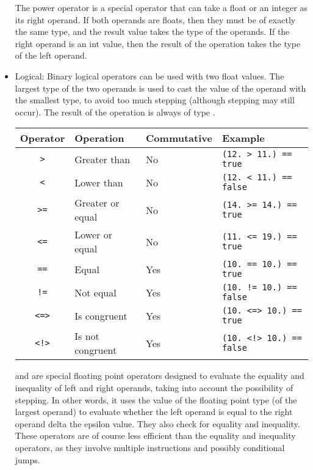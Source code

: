 \begin{itemize}
  The power operator \token{\textasciicircum{}\textasciicircum{}} is a special
  operator that can take a float or an integer as its right operand. If both
  operands are floats, then they must be of exactly the same type, and the
  result value takes the type of the operands. If the right operand is an int
  value, then the result of the operation takes the type of the left operand.

\item Logical: Binary logical operators can be used with two float values. The
  largest type of the two operands is used to cast the value of the operand with
  the smallest type, to avoid too much stepping (although stepping may still
  occur). The result of the operation is always of type .

  \begin{center}
    \begin{adjustbox}{max width=1.0\linewidth}
      \begin{tabular}{|c|lll|}
        \hline
        Operator & Operation & Commutative & Example\\[0pt]
        \hline
        \hline
        \texttt{>} & Greater than & No & \texttt{(12. > 11.) == true}\\[0pt]
        \texttt{<} & Lower than & No & \texttt{(12. < 11.) == false}\\[0pt]
        \texttt{>=} & Greater or equal & No & \texttt{(14. >= 14.) == true}\\[0pt]
        \texttt{<=} & Lower or equal & No & \texttt{(11. <= 19.) == true}\\[0pt]
        \texttt{==} & Equal & Yes & \texttt{(10. == 10.) == true}\\[0pt]
        \texttt{!=} & Not equal & Yes & \texttt{(10. != 10.) == false}\\[0pt]
        \texttt{<=>} & Is congruent & Yes & \texttt{(10. <=> 10.) == true}\\[0pt]
        \texttt{<!>} & Is not congruent & Yes & \texttt{(10. <!> 10.) == false}\\[0pt]
        \hline
      \end{tabular}
    \end{adjustbox}
  \end{center}

   \token{<=>} and \token{<!>} are special floating point operators designed
   to evaluate the equality and inequality of left and right operands, taking
   into account the possibility of stepping. In other words, it uses the
    value of the floating point type (of the largest operand)
   to evaluate whether the left operand is equal to the right operand delta the
   epsilon value. They also check for  equality and inequality.
   These operators are of course less efficient than the equality and inequality
   operators, as they involve multiple instructions and possibly conditional
   jumps.


\end{itemize}

